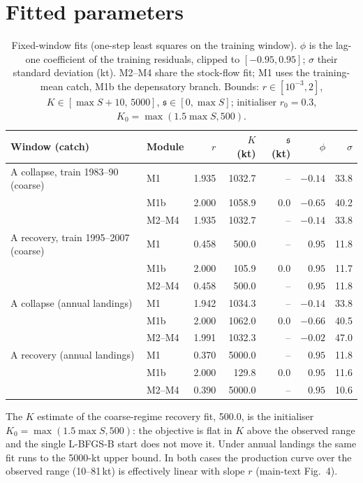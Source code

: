 \documentclass[preprint,11pt,authoryear]{elsarticle}
\theoremstyle{remark}
\newcommand{\sA}{\mathfrak{s}}
\begin{document}
\section{Fitted parameters}\label{si:params}

\begin{table}[!htb]
\centering\footnotesize\setlength{\tabcolsep}{3.5pt}
\caption{Fixed-window fits (one-step least squares on the training window). $\phi$ is the lag-one coefficient of the training residuals, clipped to $[-0.95,0.95]$; $\sigma$ their standard deviation (kt). M2--M4 share the stock-flow fit; M1 uses the training-mean catch, M1b the depensatory branch. Bounds: $r\in[10^{-3},2]$, $K\in[\max S+10,\,5000]$, $\sA\in[0,\max S]$; initialiser $r_0=0.3$, $K_0=\max(1.5\max S, 500)$.}
\label{tab:si_fixedfits}
\begin{tabular}{@{}llrrrrr@{}}
\toprule
Window (catch) & Module & $r$ & $K$ (kt) & $\sA$ (kt) & $\phi$ & $\sigma$ \\
\midrule
A collapse, train 1983--90 (coarse) & M1 & 1.935 & 1032.7 & -- & $-0.14$ & 33.8 \\
 & M1b & 2.000 & 1058.9 & 0.0 & $-0.65$ & 40.2 \\
 & M2--M4 & 1.935 & 1032.7 & -- & $-0.14$ & 33.8 \\
A recovery, train 1995--2007 (coarse) & M1 & 0.458 & 500.0 & -- & $0.95$ & 11.8 \\
 & M1b & 2.000 & 105.9 & 0.0 & $0.95$ & 11.7 \\
 & M2--M4 & 0.458 & 500.0 & -- & $0.95$ & 11.8 \\
A collapse (annual landings) & M1 & 1.942 & 1034.3 & -- & $-0.14$ & 33.8 \\
 & M1b & 2.000 & 1062.0 & 0.0 & $-0.66$ & 40.5 \\
 & M2--M4 & 1.991 & 1032.3 & -- & $-0.02$ & 47.0 \\
A recovery (annual landings) & M1 & 0.370 & 5000.0 & -- & $0.95$ & 11.8 \\
 & M1b & 2.000 & 129.8 & 0.0 & $0.95$ & 11.6 \\
 & M2--M4 & 0.390 & 5000.0 & -- & $0.95$ & 10.6 \\
\bottomrule
\end{tabular}
\end{table}

The $K$ estimate of the coarse-regime recovery fit, 500.0, is the initialiser $K_0 = \max(1.5\max S, 500)$: the objective is flat in $K$ above the observed range and the single L-BFGS-B start does not move it. Under annual landings the same fit runs to the 5000-kt upper bound. In both cases the production curve over the observed range (10--81\,kt) is effectively linear with slope $r$ (main-text Fig.~4).
\end{document}
